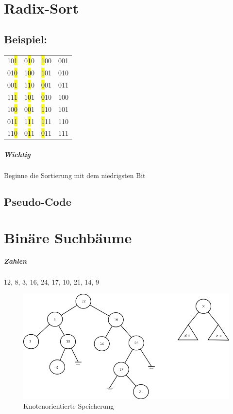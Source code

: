 \chapter{Radix-Sort}

\section{Beispiel:}
\begin{tabular}{l l l l}
  10\hl{1} & 0\hl{1}0 & \hl{1}00 & 001 \\
  01\hl{0} & 1\hl{0}0 & \hl{1}01 & 010\\
  00\hl{1} & 1\hl{1}0 & \hl{0}01 & 011 \\
  11\hl{1} & 1\hl{0}1 & \hl{0}10 & 100 \\
  10\hl{0} & 0\hl{0}1 & \hl{1}10 & 101 \\
  01\hl{1} & 1\hl{1}1 & \hl{1}11 & 110 \\
  11\hl{0} & 0\hl{1}1 & \hl{0}11 & 111 \\
\end{tabular}
\paragraph{Wichtig}Beginne die Sortierung mit dem niedrigsten Bit

\section{Pseudo-Code}



\chapter{Binäre Suchbäume}

\paragraph{Zahlen} 12, 8, 3, 16, 24, 17, 10, 21, 14, 9 

\begin{figure}[H]
\includegraphics[width=\linewidth]{09/Grafik/img3.png}
\captionsetup{justification=raggedright, singlelinecheck=false}
\caption{Knotenorientierte Speicherung}
\end{figure}
